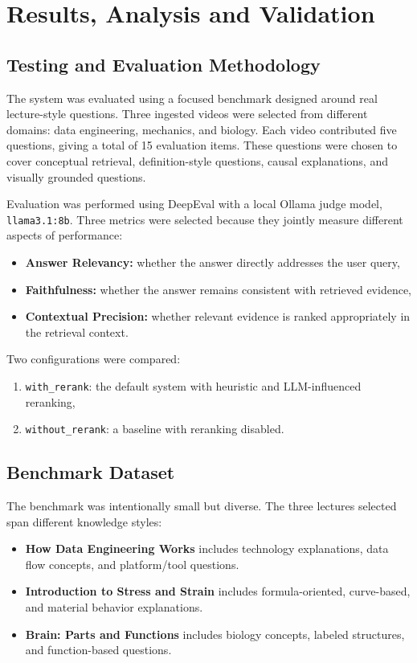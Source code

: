 \documentclass[12pt,a4paper,oneside]{report}
\begin{document}
\chapter{Results, Analysis and Validation}

\section{Testing and Evaluation Methodology}
The system was evaluated using a focused benchmark designed around real lecture-style questions. Three ingested videos were selected from different domains: data engineering, mechanics, and biology. Each video contributed five questions, giving a total of 15 evaluation items. These questions were chosen to cover conceptual retrieval, definition-style questions, causal explanations, and visually grounded questions.

Evaluation was performed using DeepEval with a local Ollama judge model, \texttt{llama3.1:8b}. Three metrics were selected because they jointly measure different aspects of performance:
\begin{itemize}
    \item \textbf{Answer Relevancy:} whether the answer directly addresses the user query,
    \item \textbf{Faithfulness:} whether the answer remains consistent with retrieved evidence,
    \item \textbf{Contextual Precision:} whether relevant evidence is ranked appropriately in the retrieval context.
\end{itemize}

Two configurations were compared:
\begin{enumerate}[label=\arabic*.]
    \item \texttt{with\_rerank}: the default system with heuristic and LLM-influenced reranking,
    \item \texttt{without\_rerank}: a baseline with reranking disabled.
\end{enumerate}

\section{Benchmark Dataset}
The benchmark was intentionally small but diverse. The three lectures selected span different knowledge styles:
\begin{itemize}
    \item \textbf{How Data Engineering Works} includes technology explanations, data flow concepts, and platform/tool questions.
    \item \textbf{Introduction to Stress and Strain} includes formula-oriented, curve-based, and material behavior explanations.
    \item \textbf{Brain: Parts and Functions} includes biology concepts, labeled structures, and function-based questions.
\end{itemize}
\end{document}
